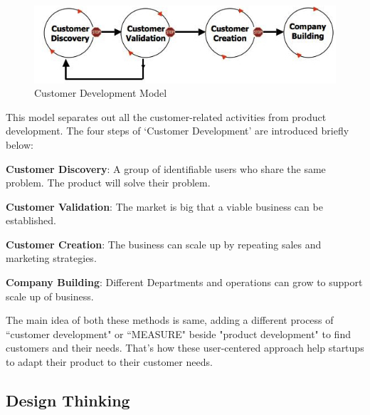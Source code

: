 \begin{figure}[H]
  \centering
  \includegraphics[width=.55\textwidth]{img/customer-development.jpg}
  \caption{Customer Development Model  \cite[p.~16]{fstE}}\label{img:customerdevmodel}
\end{figure}

This model separates out all the customer-related activities from product development. The four steps of `Customer Development' are introduced briefly below:

\textbf{Customer Discovery}: A group of identifiable users who share the same problem. The product will solve their problem.

\textbf{Customer Validation}: The market is big that a viable business can be established.

\textbf{Customer Creation}: The business can scale up by repeating sales and marketing strategies.

\textbf{Company Building}: Different Departments and operations can grow to support scale up of business.

The main idea of both these methods is same, adding a different process of ``customer development" or ``MEASURE" beside "product development" to find customers and their needs. That's how these user-centered approach help startups to adapt their product to their customer needs.







\subsection{Design Thinking}

